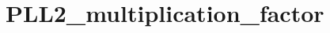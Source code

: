 \hypertarget{group___p_l_l2__multiplication__factor}{\section{P\-L\-L2\-\_\-multiplication\-\_\-factor}
\label{group___p_l_l2__multiplication__factor}
}
